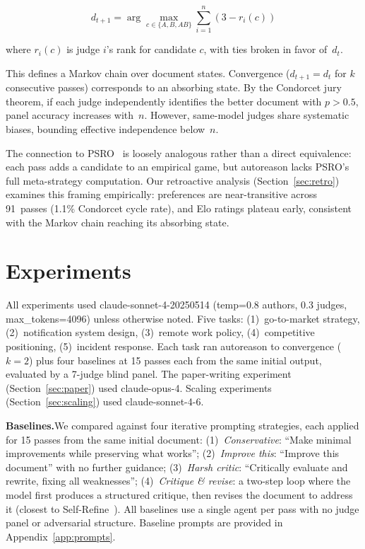 \documentclass[10pt,twocolumn]{article}
\begin{document}
$$d_{t+1} = \arg\max_{c \in \{A, B, AB\}} \sum_{i=1}^{n} (3 - r_i(c))$$

where $r_i(c)$ is judge $i$'s rank for candidate $c$, with ties broken in favor of~$d_t$.

This defines a Markov chain over document states. Convergence ($d_{t+1} = d_t$ for $k$ consecutive passes) corresponds to an absorbing state. By the Condorcet jury theorem, if each judge independently identifies the better document with $p > 0.5$, panel accuracy increases with~$n$. However, same-model judges share systematic biases, bounding effective independence below~$n$.

The connection to PSRO~\cite{psro} is loosely analogous rather than a direct equivalence: each pass adds a candidate to an empirical game, but autoreason lacks PSRO's full meta-strategy computation. Our retroactive analysis (Section~\ref{sec:retro}) examines this framing empirically: preferences are near-transitive across 91~passes (1.1\% Condorcet cycle rate), and Elo ratings plateau early, consistent with the Markov chain reaching its absorbing state.

\section{Experiments}

All experiments used claude-sonnet-4-20250514 (temp=0.8 authors, 0.3 judges, max\_tokens=4096) unless otherwise noted. Five tasks: (1)~go-to-market strategy, (2)~notification system design, (3)~remote work policy, (4)~competitive positioning, (5)~incident response. Each task ran autoreason to convergence ($k{=}2$) plus four baselines at 15 passes each from the same initial output, evaluated by a 7-judge blind panel. The paper-writing experiment (Section~\ref{sec:paper}) used claude-opus-4. Scaling experiments (Section~\ref{sec:scaling}) used claude-sonnet-4-6.

\textbf{Baselines.}\enspace We compared against four iterative prompting strategies, each applied for 15 passes from the same initial document: (1)~\textit{Conservative}: ``Make minimal improvements while preserving what works''; (2)~\textit{Improve this}: ``Improve this document'' with no further guidance; (3)~\textit{Harsh critic}: ``Critically evaluate and rewrite, fixing all weaknesses''; (4)~\textit{Critique \& revise}: a two-step loop where the model first produces a structured critique, then revises the document to address it (closest to Self-Refine~\cite{selfrefine}). All baselines use a single agent per pass with no judge panel or adversarial structure. Baseline prompts are provided in Appendix~\ref{app:prompts}.
\end{document}
